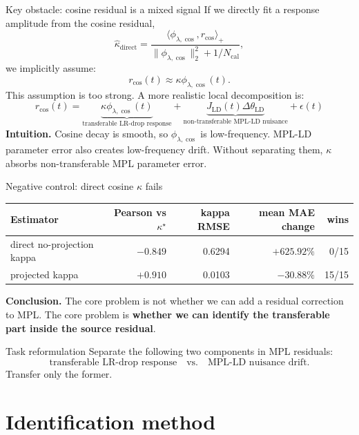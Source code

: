 \documentclass[9pt,aspectratio=169]{beamer}
\newcommand{\hl}[1]{\textcolor{blue!60!black}{\textbf{#1}}}
\begin{document}
\begin{frame}{Key obstacle: cosine residual is a mixed signal}
\small
If we directly fit a response amplitude from the cosine residual,
\[
\widehat\kappa_{\mathrm{direct}}
=
\frac{\langle \phi_{\lambda,\cos},r_{\cos}\rangle_+}
{\|\phi_{\lambda,\cos}\|_2^2+1/N_{\mathrm{cal}}},
\]
we implicitly assume:
\[
r_{\cos}(t)\approx \kappa\phi_{\lambda,\cos}(t).
\]
This assumption is too strong.
\vfill
A more realistic local decomposition is:
\[
\boxed{
r_{\cos}(t)
=
\underbrace{\kappa\phi_{\lambda,\cos}(t)}_{\text{transferable LR-drop response}}
+
\underbrace{J_{\mathrm{LD}}(t)\Delta\theta_{\mathrm{LD}}}_{\text{non-transferable MPL-LD nuisance}}
+
\epsilon(t)
}
\]
\vfill
\textbf{Intuition.}
Cosine decay is smooth, so \(\phi_{\lambda,\cos}\) is low-frequency.
MPL-LD parameter error also creates low-frequency drift.
Without separating them, \(\kappa\) absorbs non-transferable MPL parameter error.
\end{frame}

\begin{frame}{Negative control: direct cosine \(\kappa\) fails}
\small
\begin{center}
\begin{tabular}{lrrrr}
\toprule
Estimator & Pearson vs \(\kappa^\star\) & kappa RMSE & mean MAE change & wins\\
\midrule
direct no-projection kappa & \(-0.849\) & 0.6294 & \(+625.92\%\) & 0/15\\
projected kappa & \(+0.910\) & 0.0103 & \(-30.88\%\) & 15/15\\
\bottomrule
\end{tabular}
\end{center}
\vfill
\textbf{Conclusion.}
The core problem is not whether we can add a residual correction to MPL.
The core problem is \hl{whether we can identify the transferable part inside the source residual}.
\vfill
\begin{block}{Task reformulation}
Separate the following two components in MPL residuals:
\[
\text{transferable LR-drop response}
\quad\text{vs.}\quad
\text{MPL-LD nuisance drift}.
\]
Transfer only the former.
\end{block}
\end{frame}

\section{Identification method}
\end{document}
